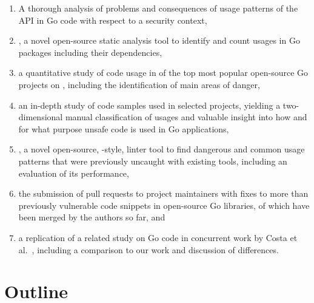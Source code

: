 \begin{enumerate}
    \item A thorough analysis of problems and consequences of usage patterns of the \unsafe{} \acrshort{API} in Go code
    with respect to a security context,

    \item \toolGeiger, a novel open-source static analysis tool to identify and count \unsafe{} usages in Go packages
    including their dependencies,

    \item a quantitative study of \unsafe{} code usage in \projsAnalyzed{} of the top \projsTotal{} most popular
    open-source Go projects on \github{}, including the identification of  main areas of danger,

    \item an in-depth study of \numberLabeledCodeSnippets{} code samples used in \projsForLabeledCodeSnippets{} selected
    projects, yielding a two-dimensional manual classification of usages and valuable insight into how and for what
    purpose unsafe code is used in Go applications,

    \item \toolSafer{}, a novel open-source, \toolVet{}-style, linter tool to find  dangerous and common
    \unsafe{} usage patterns that were previously uncaught with existing tools, including an evaluation of its
    performance,

    \item the submission of \numberPRs{} pull requests to project maintainers with fixes to more than
    \numberBugsFixedRounded{} previously vulnerable code snippets in open-source Go libraries, \numberPRsMerged{} of
    which have been merged by the authors so far, and

    \item a replication of a related study on \unsafe{} Go code in concurrent work by Costa et al.~\cite{costa2020},
    including a comparison to our work and discussion of differences.
\end{enumerate}



\section{Outline}\label{sec:outline}

